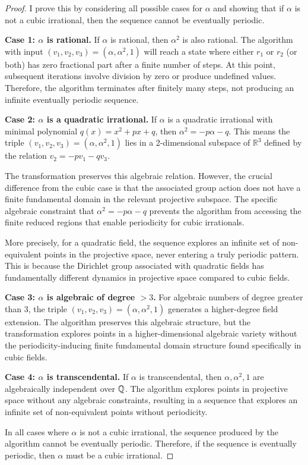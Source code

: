 \begin{proof}
I prove this by considering all possible cases for $\alpha$ and showing that if $\alpha$ is not a cubic irrational, then the sequence cannot be eventually periodic.

\textbf{Case 1: $\alpha$ is rational.} If $\alpha$ is rational, then $\alpha^2$ is also rational. The \HAPD{} algorithm with input $(v_1, v_2, v_3) = (\alpha, \alpha^2, 1)$ will reach a state where either $r_1$ or $r_2$ (or both) has zero fractional part after a finite number of steps. At this point, subsequent iterations involve division by zero or produce undefined values. Therefore, the algorithm terminates after finitely many steps, not producing an infinite eventually periodic sequence.

\textbf{Case 2: $\alpha$ is a quadratic irrational.} If $\alpha$ is a quadratic irrational with minimal polynomial $q(x) = x^2 + px + q$, then $\alpha^2 = -p\alpha - q$. This means the triple $(v_1, v_2, v_3) = (\alpha, \alpha^2, 1)$ lies in a 2-dimensional subspace of $\mathbb{R}^3$ defined by the relation $v_2 = -pv_1 - qv_3$.

The \HAPD{} transformation preserves this algebraic relation. However, the crucial difference from the cubic case is that the associated group action does not have a finite fundamental domain in the relevant projective subspace. The specific algebraic constraint that $\alpha^2 = -p\alpha - q$ prevents the algorithm from accessing the finite reduced regions that enable periodicity for cubic irrationals.

More precisely, for a quadratic field, the sequence explores an infinite set of non-equivalent points in the projective space, never entering a truly periodic pattern. This is because the Dirichlet group associated with quadratic fields has fundamentally different dynamics in projective space compared to cubic fields.

\textbf{Case 3: $\alpha$ is algebraic of degree $> 3$.} For algebraic numbers of degree greater than 3, the triple $(v_1, v_2, v_3) = (\alpha, \alpha^2, 1)$ generates a higher-degree field extension. The \HAPD{} algorithm preserves this algebraic structure, but the transformation explores points in a higher-dimensional algebraic variety without the periodicity-inducing finite fundamental domain structure found specifically in cubic fields.

\textbf{Case 4: $\alpha$ is transcendental.} If $\alpha$ is transcendental, then $\alpha, \alpha^2, 1$ are algebraically independent over $\mathbb{Q}$. The \HAPD{} algorithm explores points in projective space without any algebraic constraints, resulting in a sequence that explores an infinite set of non-equivalent points without periodicity.

In all cases where $\alpha$ is not a cubic irrational, the sequence produced by the \HAPD{} algorithm cannot be eventually periodic. Therefore, if the sequence is eventually periodic, then $\alpha$ must be a cubic irrational.
\end{proof}

